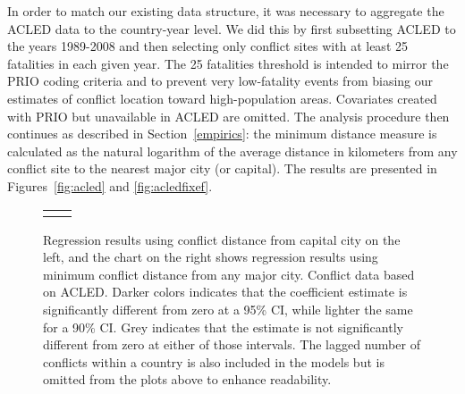 In order to match our existing data structure, it was necessary to aggregate the ACLED data to the country-year level. We did this by first subsetting ACLED to the years 1989-2008 and then selecting only conflict sites with at least 25 fatalities in each given year. The 25 fatalities threshold is intended to mirror the PRIO coding criteria and to prevent very low-fatality events from biasing our estimates of conflict location toward high-population areas. Covariates created with PRIO but unavailable in ACLED are omitted. The analysis procedure then continues as described in Section~\ref{empirics}: the minimum distance measure is calculated as the natural logarithm of the average distance in kilometers from any conflict site to the nearest major city (or capital). The results are presented in Figures~\ref{fig:acled} and \ref{fig:acledfixef}. 

\begin{figure}
	\centering
	\begin{tabular}{cc}
		\subfloat[SubFigure 1][Capital City]{
			\resizebox{.45\textwidth}{!}{}
		\label{fig:acled}} &
		\subfloat[SubFigure 2][Any Major City]{
			\resizebox{.45\textwidth}{!}{}
		\label{fig:acledfixef}}
	\end{tabular}
	\caption{Regression results using conflict distance from capital city on the left, and the chart on the right shows regression results using minimum conflict distance from any major city. Conflict data based on ACLED. Darker colors indicates that the coefficient estimate is significantly different from zero at a 95\% CI, while lighter the same for a 90\% CI. Grey indicates that the estimate is not significantly different from zero at either of those intervals. The lagged number of conflicts within a country is also included in the models but is omitted from the plots above to enhance readability.}
	\label{fig:coefplot}
\end{figure}
